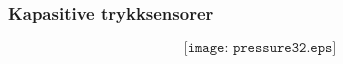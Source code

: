 \documentclass[aspectratio=169,xcolor=dvipsnames]{beamer}
\begin{document}
%
%
%
%
\begin{frame}
	\frametitle{Kapasitive trykksensorer}

	$$\texttt{[image: pressure32.eps]}$$
\end{frame}
%
%
\end{document}
